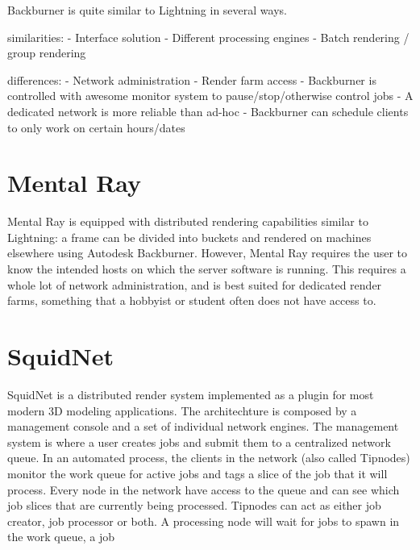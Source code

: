 Backburner is quite similar to Lightning in several ways. 

similarities:
- Interface solution
- Different processing engines
- Batch rendering / group rendering

differences: 
- Network administration
- Render farm access
- Backburner is controlled with awesome monitor system to pause/stop/otherwise control jobs
- A dedicated network is more reliable than ad-hoc
- Backburner can schedule clients to only work on certain hours/dates

\section{Mental Ray}


Mental Ray is equipped with distributed rendering capabilities similar to Lightning: a frame can be divided into buckets and rendered on machines elsewhere using Autodesk Backburner. However, Mental Ray requires the user to know the intended hosts on which the server software is running. This requires a whole lot of network administration, and is best suited for dedicated render farms, something that a hobbyist or student often does not have access to. 

\section{SquidNet}


SquidNet is a distributed render system implemented as a plugin for most modern 3D modeling applications. The architechture is composed by a management console and a set of individual network engines. The management system is where a user creates jobs and submit them to a centralized network queue. In an automated process, the clients in the network (also called Tipnodes) monitor the work queue for active jobs and tags a slice of the job that it will process. Every node in the network have access to the queue and can see which job slices that are currently being processed. Tipnodes can act as either job creator, job processor or both. A processing node will wait for jobs to spawn in the work queue, a job 





